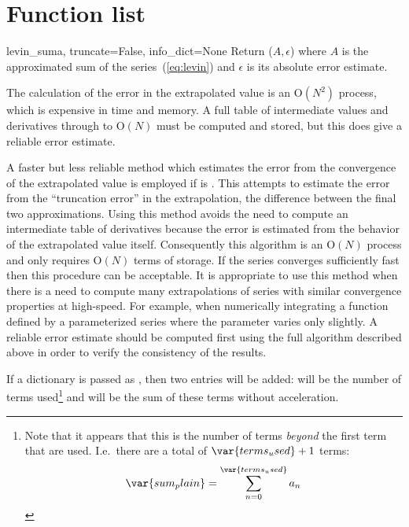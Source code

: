 \section{Function list}
\begin{funcdesc}{levin_sum}{a, truncate=False, info_dict=None}
  Return ($A, \epsilon$) where $A$ is the approximated sum of the
  series~(\ref{eq:levin}) and $\epsilon$ is its absolute error
  estimate.

  The calculation of the error in the extrapolated value is an
  O$(N^2)$ process, which is expensive in time and memory.  A full
  table of intermediate values and derivatives through to O$(N)$ must
  be computed and stored, but this does give a reliable error
  estimate.

  A faster but less reliable method which estimates the error from the
  convergence of the extrapolated value is employed if 
  is .  This attempts to estimate the error from the
  ``truncation error'' in the extrapolation, the difference between
  the final two approximations. Using this method avoids the need to
  compute an intermediate table of derivatives because the error is
  estimated from the behavior of the extrapolated value
  itself. Consequently this algorithm is an O$(N)$ process and only
  requires O$(N)$ terms of storage. If the series converges sufficiently
  fast then this procedure can be acceptable. It is appropriate to use
  this method when there is a need to compute many extrapolations of
  series with similar convergence properties at high-speed. For
  example, when numerically integrating a function defined by a
  parameterized series where the parameter varies only slightly. A
  reliable error estimate should be computed first using the full
  algorithm described above in order to verify the consistency of the
  results.

  If a dictionary is passed as , then two entries will
  be added:  will be the number of
  terms used\footnote{Note that it appears that this is the number of
    terms \emph{beyond} the first term that are used.  I.e.\ there are
    a total of $\var{terms_used}+1$ terms:
    \begin{equation}
      \var{sum_plain} = 
      \sum_{n=0}^{\var{terms_used}}
      a_{n}
    \end{equation}}
  and  will be the sum of these terms without
  acceleration.
\end{funcdesc}

